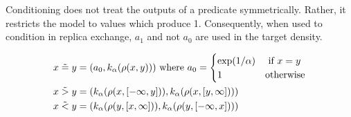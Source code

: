 Conditioning does not treat the outputs of a predicate symmetrically.
Rather, it restricts the model to values which produce 1.
Consequently, when used to condition in replica exchange, $a_1$ and not $a_0$ are used in the target density.



  {\small
  \begin{equation}
  \begin{aligned}
  x \mathrel{\tilde{=}} y &= (a_0, k_\alpha(\rho(x, y))) \text{ where } a_0 = \begin{cases}
    \exp(1/\alpha) & \text{ if } x = y\\
    1             & \text{otherwise}
  \end{cases}\\
  x \mathrel{\tilde{>}} y &= (k_\alpha(\rho(x, [-\infty, y])), k_\alpha(\rho(x, [y, \infty])))\\
  x \mathrel{\tilde{<}} y &= (k_\alpha(\rho(y, [x, \infty])), k_\alpha(\rho(y, [-\infty, x])))
  \end{aligned}
  \end{equation}
  }  %
  



